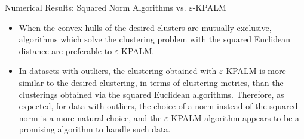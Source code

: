 \documentclass[9pt,handout]{beamer} %
\begin{document}
	\begin{frame}{Numerical Results: Squared Norm Algorithms vs. $\varepsilon$-KPALM}
		\setcounter{subfigure}{0}
		\begin{figure}
		    \centering
		\end{figure}
		\pause
		\begin{itemize}[<+->]
			\item When the convex hulls of the desired clusters are mutually exclusive, algorithms which solve the clustering problem with the squared Euclidean distance are preferable to $\varepsilon$-KPALM.
			\item In datasets with outliers, the clustering obtained with $\varepsilon$-KPALM is more similar to the desired clustering, in terms of clustering metrics, than the clusterings obtained via the squared Euclidean algorithms. 
				Therefore, as expected, for data  with outliers, the choice of a norm instead of the squared norm is a more natural choice, and the $\varepsilon$-KPALM algorithm appears to be a promising algorithm to handle such data.
		\end{itemize}
	\end{frame}
	
\end{document}
